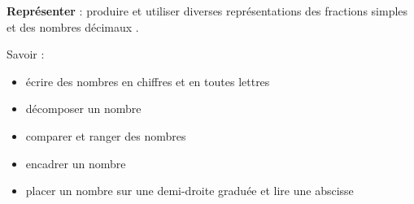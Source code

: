 \begin{mycomp}
	\textbf{Représenter} :
	produire et utiliser diverses représentations des fractions simples et des nombres décimaux .
	
\end{mycomp}


\begin{myobj}
	Savoir :
	\begin{itemize}
		
		\item  écrire des nombres en chiffres et en toutes lettres
		\item décomposer un nombre
		\item comparer et ranger des nombres
		\item  encadrer un nombre 
		\item placer un nombre sur une demi-droite graduée et lire une abscisse
	\end{itemize}
\end{myobj}